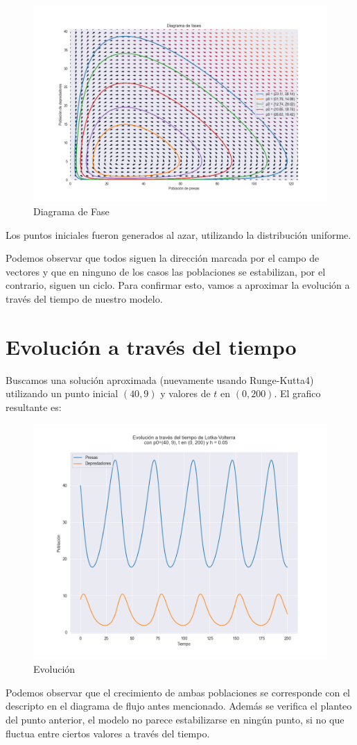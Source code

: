 \documentclass{article}
\begin{document}
\begin{figure}[H]
  \includegraphics[width=\linewidth]{../diagramas/DiagramaDeFases.png}
  \caption{Diagrama de Fase}
\end{figure}

Los puntos iniciales fueron generados al azar, utilizando la distribución uniforme.

Podemos observar que todos siguen la dirección marcada por el campo de vectores y que en ninguno de los casos las poblaciones se estabilizan, por el contrario, siguen un ciclo. Para confirmar esto, vamos a aproximar la evolución a través del tiempo de nuestro modelo.


\pagebreak
\section{Evolución a través del tiempo}

Buscamos una solución aproximada (nuevamente usando Runge-Kutta4) utilizando un punto inicial $(40, 9)$ y valores de $t$ en $(0, 200)$. El grafico resultante es:


\begin{figure}[H]
  \includegraphics[width=\linewidth]{../diagramas/Evolucion.png}
  \caption{Evolución}
\end{figure}

Podemos observar que el crecimiento de ambas poblaciones se corresponde con el descripto en el diagrama de flujo antes mencionado. Además se verifica el planteo del punto anterior, el modelo no parece estabilizarse en ningún punto, si no que fluctua entre ciertos valores a través del tiempo.
\end{document}
